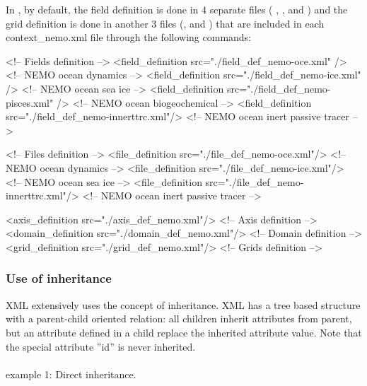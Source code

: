 \documentclass[../main/NEMO_manual]{subfiles}
\begin{document}
\noindent In \NEMO, by default, the field definition is done in 4 separate files (
,
,  and
 ) and the grid definition is done in another 3 files (,  and )
that
are included in each context\_nemo.xml file through the following commands:
\begin{xmllines}
<!-- Fields definition -->
    <field_definition src="./field_def_nemo-oce.xml"      />   <!--  NEMO ocean dynamics               -->
    <field_definition src="./field_def_nemo-ice.xml"      />   <!--  NEMO ocean sea ice                -->
    <field_definition src="./field_def_nemo-pisces.xml"   />   <!--  NEMO ocean biogeochemical         -->
    <field_definition src="./field_def_nemo-innerttrc.xml"/>   <!--  NEMO ocean inert passive tracer   -->

<!-- Files definition -->
    <file_definition src="./file_def_nemo-oce.xml"/>       <!--  NEMO ocean dynamics                   -->
    <file_definition src="./file_def_nemo-ice.xml"/>       <!--  NEMO ocean sea ice                    -->
    <file_definition src="./file_def_nemo-innerttrc.xml"/> <!--  NEMO ocean inert passive tracer       -->

    <axis_definition src="./axis_def_nemo.xml"/>           <!-- Axis definition -->
    <domain_definition src="./domain_def_nemo.xml"/>       <!-- Domain definition -->
    <grid_definition   src="./grid_def_nemo.xml"/>         <!-- Grids definition -->
\end{xmllines}

\subsubsection{Use of inheritance}

XML extensively uses the concept of inheritance.
XML has a tree based structure with a parent-child oriented relation: all children inherit attributes from parent,
but an attribute defined in a child replace the inherited attribute value.
Note that the special attribute ''id'' is never inherited.
\\
\\
example 1: Direct inheritance.
\end{document}
